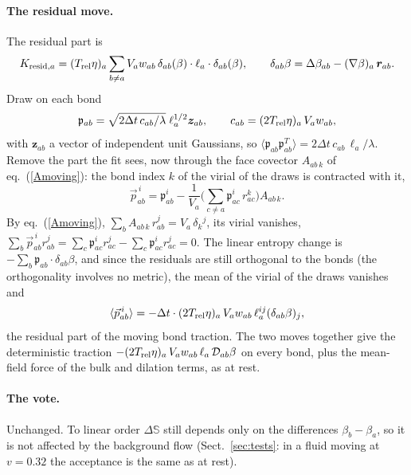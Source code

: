 \documentclass[11pt,aps,preprint,nofootinbib,superscriptaddress,tightenlines]{revtex4-2}
\def\st{\begin{equation}}
\def\stp{\end{equation}}
\def\Eq#1{eq.~(\ref{#1})}
\def\Sect#1{Sect.~\ref{#1}}
\newcommand{\avg}[1]{\langle #1\rangle}
\let\oldparagraph\paragraph
\renewcommand{\paragraph}{\par\bigskip\oldparagraph}
\begin{document}
\paragraph{The residual move.}  The residual part is
\st
K_{{\rm resid},a}=(T_{\rm rel}\eta)_a\sum_{b\neq a}V_aw_{ab}\,\delta_{ab}(\beta)\cdot\ell_a\cdot\delta_{ab}(\beta),
\qquad \delta_{ab}\beta=\Delta\beta_{ab}-(\nabla\beta)_a\,\bm r_{ab} .
\stp
Draw on each bond
\st
\mathfrak p_{ab}=\sqrt{2\Delta t\,c_{ab}/\lambda}\;\ell_a^{1/2}\bm z_{ab},\qquad
c_{ab}=(2T_{\rm rel}\eta)_a\,V_aw_{ab},
\stp
with $\bm z_{ab}$ a vector of independent unit Gaussians, so
$\avg{\mathfrak p_{ab}\mathfrak p_{ab}^T}=2\Delta t\,c_{ab}\,\ell_a/\lambda$.  Remove the part
the fit sees, now through the face covector $A_{ab\,k}$ of \Eq{Amoving}: the
bond index $k$ of the virial of the draws is contracted with it,
\st
\vec p^{\,i}_{ab}=\mathfrak p^i_{ab}-\frac1{V_a}\Big(\sum_{c\neq a}\mathfrak p^i_{ac}\,r^k_{ac}\Big)A_{ab\,k} .
\stp
By \Eq{Amoving}, $\sum_bA_{ab\,k}\,r^j_{ab}=V_a\,\delta_k{}^j$, its virial vanishes,
$\sum_b\vec p^{\,i}_{ab}r^j_{ab}=\sum_c\mathfrak p^i_{ac}r^j_{ac}-\sum_c\mathfrak p^i_{ac}r^j_{ac}=0$.
The linear entropy change is $-\sum_b\mathfrak p_{ab}\cdot\delta_{ab}\beta$, and since the
residuals are still orthogonal to the bonds (the orthogonality involves no
metric), the mean of the virial of the draws vanishes and
\st
\avg{\vec p^{\,i}_{ab}}=-\Delta t\cdot(2T_{\rm rel}\eta)_a\,V_aw_{ab}\,\ell_a^{ij}(\delta_{ab}\beta)_j ,
\stp
the residual part of the moving bond traction.  The two moves together give
the deterministic traction $-(2T_{\rm rel}\eta)_a\,V_aw_{ab}\,\ell_a\,\mathcal D_{ab}\beta$ on
every bond, plus the mean-field force of the bulk and dilation terms, as at rest.

\paragraph{The vote.}  Unchanged.  To linear order $\Delta\mathbb S$ still depends only on
the differences $\beta_b-\beta_a$, so it is not affected by the background flow
(\Sect{sec:tests}: in a fluid moving at $v=0.32$ the acceptance is the same as
at rest).
\end{document}
